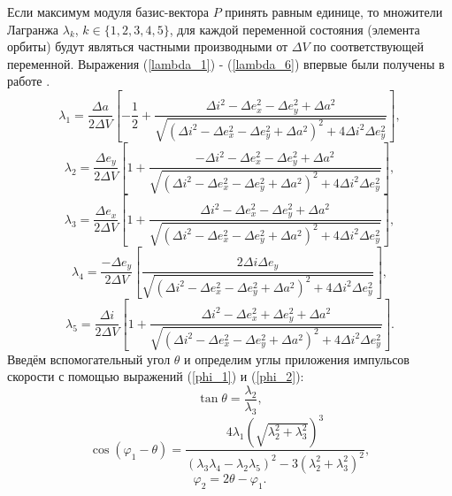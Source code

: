 \documentclass[12pt,a4paper]{extarticle}
\begin{document}
Если максимум модуля базис-вектора $P$ принять равным единице, то множители Лагранжа $\lambda_k$, $k \in \{1, 2, 3, 4, 5\}$, для каждой переменной состояния (элемента орбиты) будут являться частными производными от $\Delta V$ по соответствующей переменной. Выражения (\ref{lambda_1}) - (\ref{lambda_6}) впервые были получены в работе \cite{Edelbaum_1}.
\begin{equation}
    \lambda_1 = \frac{\Delta a}{2 \Delta V} \left[ -\frac{1}{2} + \frac{\Delta i^2 - \Delta e_x^2 - \Delta e_y^2 + \Delta a^2}{\sqrt{(\Delta i^2 - \Delta e_x^2 - \Delta e_y^2 + \Delta a^2)^2 + 4 \Delta i^2 \Delta e_y^2}} \right],
\label{lambda_1}
\end{equation}
\begin{equation}
    \lambda_2 = \frac{\Delta e_y}{2 \Delta V} \left[ 1 + \frac{-\Delta i^2 - \Delta e_x^2 - \Delta e_y^2 + \Delta a^2}{\sqrt{(\Delta i^2 - \Delta e_x^2 - \Delta e_y^2 + \Delta a^2)^2 + 4 \Delta i^2 \Delta e_y^2}} \right],
\end{equation}
\begin{equation}
    \lambda_3 = \frac{\Delta e_x}{2 \Delta V} \left[ 1 + \frac{\Delta i^2 - \Delta e_x^2 - \Delta e_y^2 + \Delta a^2}{\sqrt{(\Delta i^2 - \Delta e_x^2 - \Delta e_y^2 + \Delta a^2)^2 + 4 \Delta i^2 \Delta e_y^2}} \right],
\end{equation}
\begin{equation}
    \lambda_4 = \frac{-\Delta e_y}{2 \Delta V} \left[ \frac{2 \Delta i \Delta e_y}{\sqrt{(\Delta i^2 - \Delta e_x^2 - \Delta e_y^2 + \Delta a^2)^2 + 4 \Delta i^2 \Delta e_y^2}} \right],
\end{equation}
\begin{equation}
    \lambda_5 = \frac{\Delta i}{2 \Delta V} \left[ 1 + \frac{\Delta i^2 - \Delta e_x^2 + \Delta e_y^2 + \Delta a^2}{\sqrt{(\Delta i^2 - \Delta e_x^2 - \Delta e_y^2 + \Delta a^2)^2 + 4 \Delta i^2 \Delta e_y^2}} \right].
\label{lambda_6}
\end{equation}
Введём вспомогательный угол $\theta$ и определим углы приложения импульсов скорости с помощью выражений (\ref{phi_1}) и (\ref{phi_2}):
\begin{equation}
    \tan \theta = \frac{\lambda_2}{\lambda_3},
\end{equation}
\begin{equation}
    \cos (\varphi_1 - \theta) = \frac{4 \lambda_1 \left( \sqrt{\lambda_2^2 + \lambda_3^2} \right)^3}{(\lambda_3 \lambda_4 - \lambda_2 \lambda_5)^2 - 3 \left( \lambda_2^2 + \lambda_3^2 \right)^2},
\label{phi_1}
\end{equation}
\begin{equation}
    \varphi_2 = 2\theta - \varphi_1.
\label{phi_2}
\end{equation}
\end{document}
